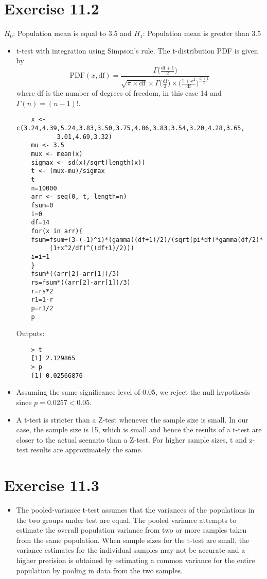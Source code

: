 \documentclass[a4paper]{article}
\begin{document}
\section*{Exercise 11.2}
$H_0$: Population mean is equal to 3.5 and $H_1$: Population mean is greater than 3.5
\begin{itemize}
	\item t-test with integration using Simpson's rule. The t-distribution PDF is given by
	\begin{equation*}
\text{PDF}(x, \text{df})=\frac{\Gamma\Big(\frac{\text{df}+1}{2}\Big)}{\sqrt{\pi\times \text{df}}\times \Gamma\Big(\frac{\text{df}}{2}\Big)\times \Big(\frac{1+x^2}{\text{df}}\Big)^\frac{\text{df}+1}{2}}
	\end{equation*}
	where df is the number of degrees of freedom, in this case 14 and $\Gamma(n)=(n-1)!$.
	\begin{verbatim}
	x <- c(3.24,4.39,5.24,3.83,3.50,3.75,4.06,3.83,3.54,3.20,4.28,3.65,
           3.01,4.69,3.32)
	mu <- 3.5
	mux <- mean(x)
	sigmax <- sd(x)/sqrt(length(x))
	t <- (mux-mu)/sigmax
	t
	n=10000
	arr <- seq(0, t, length=n)
	fsum=0
	i=0
	df=14
	for(x in arr){
	fsum=fsum+(3-(-1)^i)*(gamma((df+1)/2)/(sqrt(pi*df)*gamma(df/2)*
	     (1+x^2/df)^((df+1)/2)))
	i=i+1
	}
	fsum*((arr[2]-arr[1])/3)
	rs=fsum*((arr[2]-arr[1])/3)
	r=rs*2
	r1=1-r
	p=r1/2
	p
	\end{verbatim}
	Outputs:
	\begin{verbatim}
	> t
	[1] 2.129865
	> p
	[1] 0.02566876
	\end{verbatim}
	\item Assuming the same significance level of 0.05, we reject the null hypothesis since $p=0.0257<0.05$.
	\item A t-test is stricter than a Z-test whenever the sample size is small. In our case, the sample size is 15, which is small and hence the results of a t-test are closer to the actual scenario than a Z-test. For higher sample sizes, t and z-test results are approximately the same.
\end{itemize}
\section*{Exercise 11.3}
\begin{itemize}
	\item The pooled-variance t-test assumes that the variances of the populations in the two groups under test are equal. The pooled variance attempts to estimate the overall population variance from two or more samples taken from the same population. When sample sizes for the t-test are small, the variance estimates for the individual samples may not be accurate and a higher precision is obtained by estimating a common variance for the entire population by pooling in data from the two samples.
\end{itemize}
\end{document}
